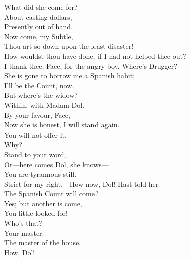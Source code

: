 \documentclass[a4paper,oneside,12pt]{memoir}
\begin{document}
\begin{drama*}
\facespeaks What did she come for?\\
\subtlespeaks {} About casting dollars,\\
Presently out of hand.\\
\facespeaks {} Now come, my Subtle,\\
Thou art so down upon the least disaster!\\
How wouldst thou have done, if I had not helped thee out?\\
\subtlespeaks I thank thee, Face, for the angry boy. Where's Drugger?\\
\facespeaks She is gone to borrow me a Spanish habit;\\
I'll be the Count, now.\\
\subtlespeaks {} But where's the widow?\\
\facespeaks Within, with Madam Dol.\\
\subtlespeaks {} By your favour, Face,\\
Now she is honest, I will stand again.\\
\facespeaks You will not offer it.\\
\subtlespeaks {} Why?\\
\facespeaks {} Stand to your word,\\
Or---here comes Dol, she knows---\\
\subtlespeaks {} You are tyrannous still.\\
\facespeaks Strict for my right.---How now, Dol! Hast told her\\
The Spanish Count will come?\\
\dolspeaks {} Yes; but another is come,\\
You little looked for!\\
\facespeaks {} Who's that?\\
\dolspeaks {} Your master:\\
The master of the house.\\
\subtlespeaks {} How, Dol!\\

\end{drama*}
\end{document}
